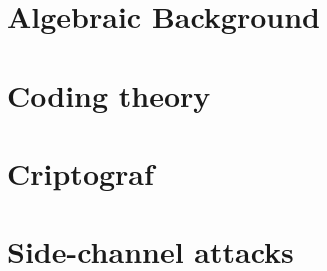 \section{Algebraic Background}
\section{Coding theory}
\section{Criptograf}
\section{Side-channel attacks}